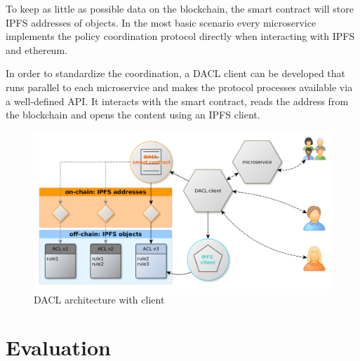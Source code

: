 \documentclass[12pt, conference]{IEEEtran}
\begin{document}
To keep as little as possible data on the blockchain, the smart contract will store IPFS addresses of objects. In the most basic scenario every microservice implements the policy coordination protocol directly when interacting with IPFS and ethereum. 

In order to standardize the coordination, a DACL client can be developed that runs parallel to each microservice and makes the protocol processes available via a well-defined API. It interacts with the smart contract, reads the address from the blockchain and opens the content using an IPFS client.

\newpage

\begin{figure}[!hb]
  \centering
  \includegraphics[width=\linewidth]{figures/eth-ipfs-design-with-client.png}
  \caption{DACL architecture with client}
  \label{fig:ipfs-design-with-client}
  \centering
\end{figure}


%



\section{Evaluation}
\end{document}
